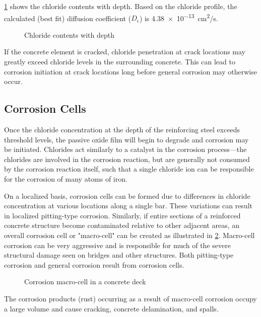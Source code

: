 \ref{fig:chloride-contents-with-depth} shows the chloride contents with depth. Based on the chloride profile, the calculated (best fit) diffusion coefficient ($D_\text{c}$) is \qty{4.38e-13}{cm^2/s}.

\begin{figure}
  \caption{Chloride contents with depth}
  \label{fig:chloride-contents-with-depth}
\end{figure}

If the concrete element is cracked, chloride penetration at crack locations may greatly exceed chloride levels in the surrounding concrete. This can lead to corrosion initiation at crack locations long before general corrosion may otherwise occur.

\subsection{Corrosion Cells}
Once the chloride concentration at the depth of the reinforcing steel exceeds threshold levels, the passive oxide
film will begin to degrade and corrosion may be initiated. Chlorides act similarly to a catalyst in the corrosion
process—the chlorides are involved in the corrosion reaction, but are generally not consumed by the corrosion
reaction itself, such that a single chloride ion can be responsible for the corrosion of many atoms of iron.

On a localized basis, corrosion cells can be formed due to differences in chloride concentration at various
locations along a single bar. These variations can result in localized pitting-type corrosion. Similarly, if entire
sections of a reinforced concrete structure become contaminated relative to other adjacent areas, an overall corrosion
cell or "macro-cell" can be created as illustrated in \cref{fig:corrosion-macro-cell}. Macro-cell corrosion can be very aggressive and is
responsible for much of the severe structural damage seen on bridges and other structures. Both pitting-type
corrosion and general corrosion result from corrosion cells.

\begin{figure}
  \caption{Corrosion macro-cell in a concrete deck}
  \label{fig:corrosion-macro-cell}
\end{figure}

The corrosion products (rust) occurring as a result of macro-cell corrosion occupy a large volume and cause
cracking, concrete delamination, and spalls.


